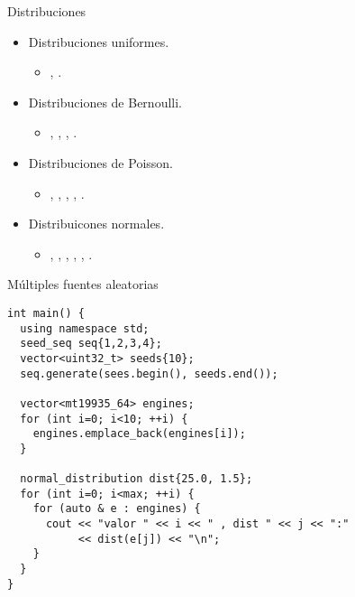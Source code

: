 \begin{frame}[t]{Distribuciones}
\begin{itemize}
  \item Distribuciones uniformes.
    \begin{itemize}
      \item {}, .
    \end{itemize}
  \vfill\pause
  \item Distribuciones de Bernoulli.
    \begin{itemize}
      \item
        ,
        ,
        ,
        .
    \end{itemize}
  \vfill\pause
  \item Distribuciones de Poisson.
    \begin{itemize}
      \item
        ,
        ,
        ,
        ,
        .
    \end{itemize}
  \vfill\pause
  \item Distribuicones normales.
    \begin{itemize}
      \item
        ,
        ,
        ,
        ,
        ,
        .
    \end{itemize}
\end{itemize}
\end{frame}

\begin{frame}[t,fragile]
\begin{block}{Múltiples fuentes aleatorias}
\begin{lstlisting}
int main() {
  using namespace std;
  seed_seq seq{1,2,3,4};
  vector<uint32_t> seeds{10};
  seq.generate(sees.begin(), seeds.end());
  
  vector<mt19935_64> engines;
  for (int i=0; i<10; ++i) {
    engines.emplace_back(engines[i]);
  }

  normal_distribution dist{25.0, 1.5};
  for (int i=0; i<max; ++i) {
    for (auto & e : engines) {
      cout << "valor " << i << " , dist " << j << ":"
           << dist(e[j]) << "\n";
    }
  }
}
\end{lstlisting}
\end{block}
\end{frame}
